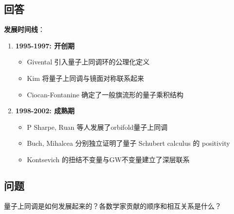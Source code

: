 \subsection{回答}
\textbf{发展时间线}：
\begin{enumerate}
\item \textbf{1995-1997: 开创期}
  \begin{itemize}
  \item Givental 引入量子上同调环的公理化定义
  \item Kim 将量子上同调与镜面对称联系起来
  \item Ciocan-Fontanine 确定了一般旗流形的量子乘积结构
  \end{itemize}

\item \textbf{1998-2002: 成熟期}
  \begin{itemize}
  \item P Sharpe, Ruan 等人发展了orbifold量子上同调
  \item Buch, Mihalcea 分别独立证明了量子 Schubert calculus 的 positivity
  \item Kontsevich 的扭结不变量与GW不变量建立了深层联系
  \end{itemize}
\end{enumerate}

\subsection{问题}
量子上同调是如何发展起来的？各数学家贡献的顺序和相互关系是什么？

